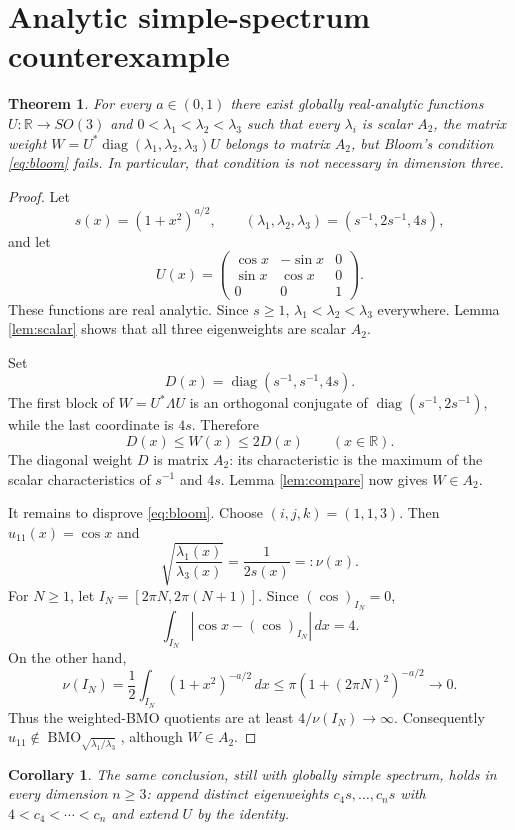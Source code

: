 \documentclass[10pt]{article}
\newtheorem{theorem}{Theorem}
\newtheorem{corollary}{Corollary}
\newcommand{\BMO}{\operatorname{BMO}}
\newcommand{\diag}{\operatorname{diag}}
\newcommand{\R}{\mathbb R}
\begin{document}
\section{Analytic simple-spectrum counterexample}

\begin{theorem}\label{thm:main}
For every $a\in(0,1)$ there exist globally real-analytic functions
$U:\R\to SO(3)$ and $0<\lambda_1<\lambda_2<\lambda_3$ such that every
$\lambda_i$ is scalar $A_2$, the matrix weight
$W=U^*\diag(\lambda_1,\lambda_2,\lambda_3)U$ belongs to matrix $A_2$, but
Bloom's condition \eqref{eq:bloom} fails.  In particular, that condition is
not necessary in dimension three.
\end{theorem}

\begin{proof}
Let
\[
 s(x)=(1+x^2)^{a/2},\qquad
 (\lambda_1,\lambda_2,\lambda_3)=(s^{-1},2s^{-1},4s),
\]
and let
\[
 U(x)=\begin{pmatrix}
 \cos x&-\sin x&0\\
 \sin x& \cos x&0\\
 0&0&1
 \end{pmatrix}.
\]
These functions are real analytic.  Since $s\ge1$,
$\lambda_1<\lambda_2<\lambda_3$ everywhere.  Lemma \ref{lem:scalar} shows
that all three eigenweights are scalar $A_2$.

Set
\[
 D(x)=\diag(s^{-1},s^{-1},4s).
\]
The first block of $W=U^*\Lambda U$ is an orthogonal conjugate of
$\diag(s^{-1},2s^{-1})$, while the last coordinate is $4s$.  Therefore
\[
 D(x)\le W(x)\le2D(x)\qquad(x\in\R).
\]
The diagonal weight $D$ is matrix $A_2$: its characteristic is the maximum of
the scalar characteristics of $s^{-1}$ and $4s$.  Lemma \ref{lem:compare}
now gives $W\in A_2$.

It remains to disprove \eqref{eq:bloom}.  Choose $(i,j,k)=(1,1,3)$.  Then
$u_{11}(x)=\cos x$ and
\[
 \sqrt{\frac{\lambda_1(x)}{\lambda_3(x)}}=\frac1{2s(x)}=:\nu(x).
\]
For $N\ge1$, let $I_N=[2\pi N,2\pi(N+1)]$.  Since $(\cos)_{I_N}=0$,
\[
 \int_{I_N}|\cos x-(\cos)_{I_N}|\,dx=4.
\]
On the other hand,
\[
 \nu(I_N)
 =\frac12\int_{I_N}(1+x^2)^{-a/2}\,dx
 \le \pi(1+(2\pi N)^2)^{-a/2}\longrightarrow0.
\]
Thus the weighted-BMO quotients are at least $4/\nu(I_N)\to\infty$.
Consequently $u_{11}\notin\BMO_{\sqrt{\lambda_1/\lambda_3}}$, although
$W\in A_2$.
\end{proof}

\begin{corollary}
The same conclusion, still with globally simple spectrum, holds in every
dimension $n\ge3$: append distinct eigenweights $c_4s,\ldots,c_ns$ with
$4<c_4<\cdots<c_n$ and extend $U$ by the identity.
\end{corollary}
\end{document}
